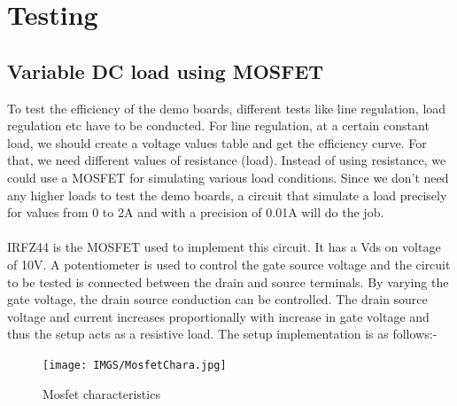 

\chapter{Testing}

\section{Variable DC load using MOSFET}
To test the efficiency of the demo boards, different tests like line regulation, load regulation etc have to be conducted. For line regulation, at a certain constant load, we should create a voltage values table and get the efficiency curve. For that, we need different values of resistance (load). Instead of using resistance, we could use a MOSFET for simulating various load conditions. Since we don’t need any higher loads to test the demo boards, a circuit that simulate a load precisely for values from 0 to 2A and with a precision of 0.01A will do the job.
\\ \\
IRFZ44 is the MOSFET used to implement this circuit. It has a Vds on voltage of 10V. A potentiometer is used to control the gate source voltage and the circuit to be tested is connected between the drain and source terminals. By varying the gate voltage, the drain source conduction can be controlled. The drain source voltage and current increases proportionally with increase in gate voltage and thus the setup acts as a resistive load. The setup implementation is as follows:-
\begin{figure}[h]
	\centering
	\texttt{[image: IMGS/MosfetChara.jpg]}
	\caption{Mosfet characteristics}
	\label{fig:arch}
\end{figure} 

